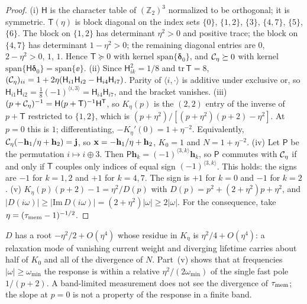\begin{proof}
(i) $\mathsf H$ is the character table of $(\mathbb Z_2)^3$ normalized to be orthogonal; it is symmetric.
$\mathsf T(\eta)$ is block diagonal on the index sets $\{0\}$, $\{1,2\}$, $\{3\}$, $\{4,7\}$, $\{5\}$,
$\{6\}$. The block on $\{1,2\}$ has determinant $\eta^2>0$ and positive trace; the block on $\{4,7\}$ has
determinant $1-\eta^2>0$; the remaining diagonal entries are $0$, $2-\eta^2>0$, $1$, $1$. Hence
$\mathsf T\succeq0$ with kernel $\mathrm{span}\{\bm\delta_0\}$, and $\mathcal C_\eta\succeq0$ with kernel
$\mathrm{span}\{\mathsf H\bm\delta_0\}=\mathrm{span}\{\ee\}$.
(ii) Since $\mathsf H_{ik}^2=1/8$ and $\mathrm{tr}\,\mathsf T=8$,
$(\mathcal C_\eta)_{ii}=1+2\eta(\mathsf H_{i1}\mathsf H_{i2}-\mathsf H_{i4}\mathsf H_{i7})$. Parity of
$\langle i,\cdot\rangle$ is additive under exclusive or, so
$\mathsf H_{i1}\mathsf H_{i2}=\tfrac18(-1)^{\langle i,3\rangle}=\mathsf H_{i4}\mathsf H_{i7}$, and the
bracket vanishes.
(iii) $(p+\mathcal C_\eta)^{-1}=\mathsf H(p+\mathsf T)^{-1}\mathsf H^{\mathsf T}$, so $K_\eta(p)$ is the $(2,2)$ entry of
the inverse of $p+\mathsf T$ restricted to $\{1,2\}$, which is $(p+\eta^2)/[(p+\eta^2)(p+2)-\eta^2]$. At
$p=0$ this is $1$; differentiating, $-K_\eta'(0)=1+\eta^{-2}$. Equivalently,
$\mathcal C_\eta(-\mathbf h_1/\eta+\mathbf h_2)=\mathbf j$, so $\mathbf x=-\mathbf h_1/\eta+\mathbf h_2$, $K_0=1$ and
$N=1+\eta^{-2}$.
(iv) Let $\mathsf P$ be the permutation $i\mapsto i\oplus3$. Then $\mathsf P\mathbf h_k=(-1)^{\langle3,k\rangle}\mathbf h_k$,
so $\mathsf P$ commutes with $\mathcal C_\eta$ if and only if $\mathsf T$ couples only indices of equal sign
$(-1)^{\langle 3,k\rangle}$. This holds: the signs are $-1$ for $k=1,2$ and $+1$ for $k=4,7$. The sign
is $+1$ for $k=0$ and $-1$ for $k=2$.
(v) $K_\eta(p)(p+2)-1=\eta^2/D(p)$ with $D(p)=p^2+(2+\eta^2)p+\eta^2$, and
$|D(i\omega)|\ge|\mathrm{Im}\,D(i\omega)|=(2+\eta^2)|\omega|\ge2|\omega|$.
For the consequence, take $\eta=(\tau_{\rm mem}-1)^{-1/2}$.
\end{proof}

\begin{remark}[Mechanism]
$D$ has a root $-\eta^2/2+O(\eta^4)$ whose residue in $K_\eta$ is $\eta^2/4+O(\eta^4)$: a relaxation mode
of vanishing current weight and diverging lifetime carries about half of $K_0$ and all of the divergence
of $N$. Part~(v) shows that at frequencies $|\omega|\ge\omega_{\min}$ the response is within a relative
$\eta^2/(2\omega_{\min})$ of the single fast pole $1/(p+2)$. A band-limited measurement does not see
the divergence of $\tau_{\rm mem}$; the slope at $p=0$ is not a property of the response in a finite band.
\end{remark}

